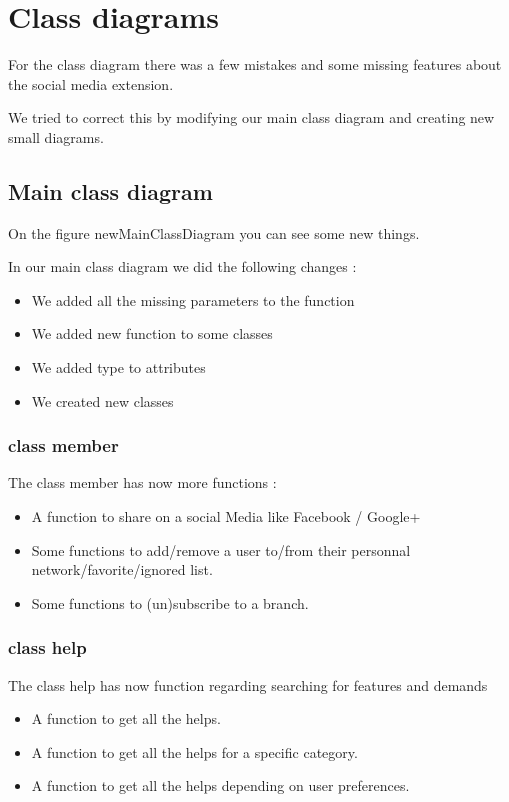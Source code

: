 \documentclass[11pt, a4paper]{article}   	%
\begin{document}
\section{Class diagrams}

For the class diagram there was a few mistakes and some missing features about the social media extension. 

We tried to correct this by modifying our main class diagram and creating new small diagrams.


\subsection{Main class diagram}


On the figure {newMainClassDiagram} you can see some new things.

In our main class diagram we did the following changes :

\begin{itemize}
\item We added all the missing parameters to the function
\item We added new function to some classes 
\item We added type to attributes
\item We created new classes 
\end{itemize}

\subsubsection{class member}

The class member has now more functions :
\begin{itemize}
\item A function to share on a social Media like Facebook / Google+
\item Some functions to add/remove a user to/from their personnal network/favorite/ignored list.
\item Some functions to (un)subscribe to a branch.
\end{itemize}

\subsubsection{class help}

The class help has now function regarding searching for features and demands
\begin{itemize}
\item A function to get all the helps.
\item A function to get all the helps for a specific category.
\item A function to get all the helps depending on user preferences.
\end{itemize}
\end{document}
